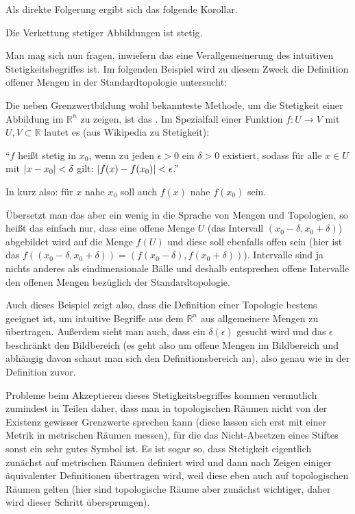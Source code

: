 \documentclass[../H_Analysis_main.tex]{subfiles}
\begin{document}
Als direkte Folgerung ergibt sich das folgende Korollar.
\begin{cor}
Die Verkettung stetiger Abbildungen ist stetig.
\end{cor}

Man mag sich nun fragen, inwiefern das eine Verallgemeinerung des intuitiven Stetigkeitsbegriffes ist. Im folgenden Beispiel wird zu diesem Zweck die Definition offener Mengen in der Standardtopologie untersucht:

\begin{bsp}
Die neben Grenzwertbildung wohl bekannteste Methode, um die Stetigkeit einer Abbildung im $\mathbb{R}^n$ zu zeigen, ist das . Im Spezialfall einer Funktion $f: U \rightarrow V$ mit $U, V \subset \mathbb{R}$ lautet es (aus Wikipedia zu Stetigkeit): 
\begin{center}
\enquote{$f$ heißt stetig in $x_0$, wenn zu jeden $\epsilon > 0$ ein $\delta > 0$ existiert, sodass für alle $x \in U$ mit $\abs{x - x_0} < \delta$ gilt: $\abs{f(x) - f(x_0)} < \epsilon$.}
\end{center}
In kurz also: für $x$ nahe $x_0$ soll auch $f(x)$ nahe $f(x_0)$ sein.

Übersetzt man das aber ein wenig in die Sprache von Mengen und Topologien, so heißt das einfach nur, dass eine offene Menge $U$ (das Intervall $(x_0 - \delta, x_0 + \delta)$) abgebildet wird auf die Menge $f(U)$ und diese soll ebenfalls offen sein (hier ist das $f((x_0 - \delta, x_0 + \delta)) = (f(x_0 - \delta), f(x_0 + \delta))$). Intervalle sind ja nichts anderes als eindimensionale Bälle und deshalb entsprechen offene Intervalle den offenen Mengen bezüglich der Standardtopologie.

Auch dieses Beispiel zeigt also, dass die Definition einer Topologie bestens geeignet ist, um intuitive Begriffe aus dem $\mathbb{R}^n$ aus allgemeinere Mengen zu übertragen. Außerdem sieht man auch, dass ein $\delta(\epsilon)$ gesucht wird und das $\epsilon$ beschränkt den Bildbereich (es geht also um offene Mengen im Bildbereich und abhängig davon schaut man sich den Definitionsbereich an), also genau wie in der Definition zuvor.
\end{bsp}

Probleme beim Akzeptieren dieses Stetigkeitsbegriffes kommen vermutlich zumindest in Teilen daher, dass man in topologischen Räumen nicht von der Existenz gewisser Grenzwerte sprechen kann (diese lassen sich erst mit einer Metrik in metrischen Räumen messen), für die das Nicht-Absetzen eines Stiftes sonst ein sehr gutes Symbol ist. Es ist sogar so, dass Stetigkeit eigentlich zunächst auf metrischen Räumen definiert wird und dann nach Zeigen einiger äquivalenter Definitionen übertragen wird, weil diese eben auch auf topologischen Räumen gelten (hier sind topologische Räume aber zunächst wichtiger, daher wird dieser Schritt übersprungen).
\end{document}
